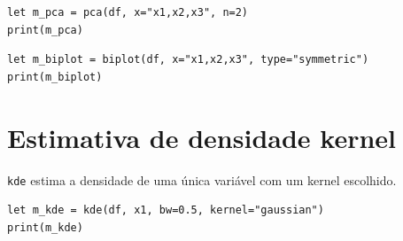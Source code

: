 \begin{lstlisting}[caption={PCA}]
let m_pca = pca(df, x="x1,x2,x3", n=2)
print(m_pca)
\end{lstlisting}

\begin{lstlisting}[caption={Biplot}]
let m_biplot = biplot(df, x="x1,x2,x3", type="symmetric")
print(m_biplot)
\end{lstlisting}

\section{Estimativa de densidade kernel}

\texttt{kde} estima a densidade de uma única variável com um kernel escolhido.

\begin{lstlisting}[caption={KDE}]
let m_kde = kde(df, x1, bw=0.5, kernel="gaussian")
print(m_kde)
\end{lstlisting}
